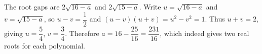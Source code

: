 The root gaps are $2\sqrt{16-a}$ and $2\sqrt{15-a}$. Write $u=\sqrt{16-a}$ and $v=\sqrt{15-a}$, so $u-v=\dfrac{1}{2}$ and $(u-v)(u+v)=u^2-v^2=1$. Thus $u+v=2$, giving $u=\dfrac{5}{4}$, $v=\dfrac{3}{4}$. Therefore $a=16-\dfrac{25}{16}=\boxed{\dfrac{231}{16}}$, which indeed gives two real roots for each polynomial.
